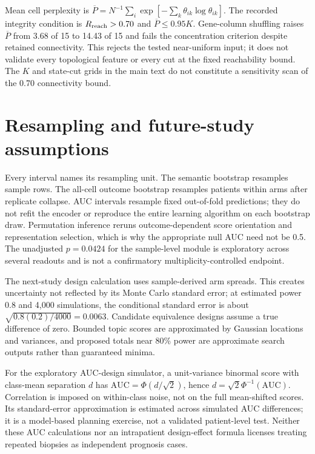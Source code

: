 Mean cell perplexity is $\overline P=N^{-1}\sum_i\exp[-\sum_k\theta_{ik}\log\theta_{ik}]$. The recorded integrity condition is $R_{\rm reach}>0.70$ and $\overline P\leq0.95K$. Gene-column shuffling raises $\overline P$ from 3.68 of 15 to 14.43 of 15 and fails the concentration criterion despite retained connectivity. This rejects the tested near-uniform input; it does not validate every topological feature or every cut at the fixed reachability bound. The $K$ and state-cut grids in the main text do not constitute a sensitivity scan of the 0.70 connectivity bound.

\section{Resampling and future-study assumptions}
Every interval names its resampling unit. The semantic bootstrap resamples sample rows. The all-cell outcome bootstrap resamples patients within arms after replicate collapse. AUC intervals resample fixed out-of-fold predictions; they do not refit the encoder or reproduce the entire learning algorithm on each bootstrap draw. Permutation inference reruns outcome-dependent score orientation and representation selection, which is why the appropriate null AUC need not be 0.5. The unadjusted $p=0.0424$ for the sample-level module is exploratory across several readouts and is not a confirmatory multiplicity-controlled endpoint.

The next-study design calculation uses sample-derived arm spreads. This creates uncertainty not reflected by its Monte Carlo standard error; at estimated power 0.8 and 4,000 simulations, the conditional standard error is about $\sqrt{0.8(0.2)/4000}=0.0063$. Candidate equivalence designs assume a true difference of zero. Bounded topic scores are approximated by Gaussian locations and variances, and proposed totals near 80\% power are approximate search outputs rather than guaranteed minima.

For the exploratory AUC-design simulator, a unit-variance binormal score with class-mean separation $d$ has $\mathrm{AUC}=\Phi(d/\sqrt2)$, hence $d=\sqrt2\Phi^{-1}(\mathrm{AUC})$. Correlation is imposed on within-class noise, not on the full mean-shifted scores. Its standard-error approximation is estimated across simulated AUC differences; it is a model-based planning exercise, not a validated patient-level test. Neither these AUC calculations nor an intrapatient design-effect formula licenses treating repeated biopsies as independent prognosis cases.

